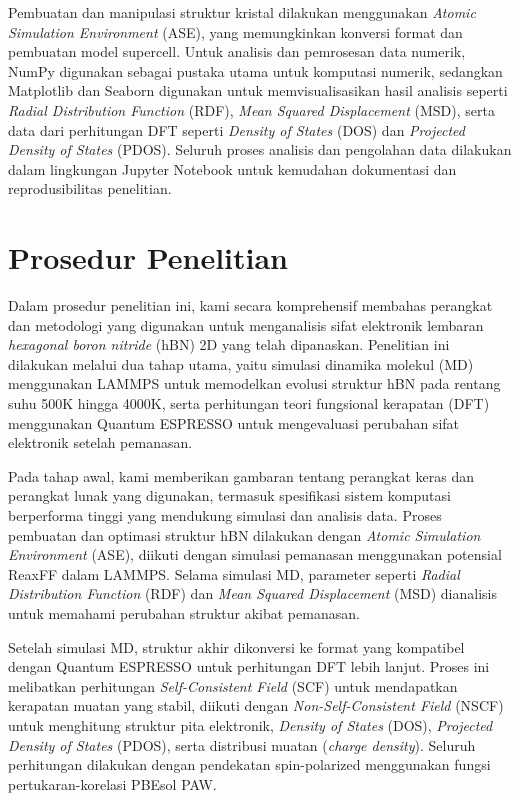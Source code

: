 Pembuatan dan manipulasi struktur kristal dilakukan menggunakan \textit{Atomic Simulation Environment} (ASE), yang memungkinkan konversi format dan pembuatan model supercell. Untuk analisis dan pemrosesan data numerik, NumPy digunakan sebagai pustaka utama untuk komputasi numerik, sedangkan Matplotlib dan Seaborn digunakan untuk memvisualisasikan hasil analisis seperti \textit{Radial Distribution Function} (RDF), \textit{Mean Squared Displacement} (MSD), serta data dari perhitungan DFT seperti \textit{Density of States} (DOS) dan \textit{Projected Density of States} (PDOS). Seluruh proses analisis dan pengolahan data dilakukan dalam lingkungan Jupyter Notebook untuk kemudahan dokumentasi dan reprodusibilitas penelitian.

\section{Prosedur Penelitian}
Dalam prosedur penelitian ini, kami secara komprehensif membahas perangkat dan metodologi yang digunakan untuk menganalisis sifat elektronik lembaran \textit{hexagonal boron nitride} (hBN) 2D yang telah dipanaskan. Penelitian ini dilakukan melalui dua tahap utama, yaitu simulasi dinamika molekul (MD) menggunakan LAMMPS untuk memodelkan evolusi struktur hBN pada rentang suhu 500K hingga 4000K, serta perhitungan teori fungsional kerapatan (DFT) menggunakan Quantum ESPRESSO untuk mengevaluasi perubahan sifat elektronik setelah pemanasan.

Pada tahap awal, kami memberikan gambaran tentang perangkat keras dan perangkat lunak yang digunakan, termasuk spesifikasi sistem komputasi berperforma tinggi yang mendukung simulasi dan analisis data. Proses pembuatan dan optimasi struktur hBN dilakukan dengan \textit{Atomic Simulation Environment} (ASE), diikuti dengan simulasi pemanasan menggunakan potensial ReaxFF dalam LAMMPS. Selama simulasi MD, parameter seperti \textit{Radial Distribution Function} (RDF) dan \textit{Mean Squared Displacement} (MSD) dianalisis untuk memahami perubahan struktur akibat pemanasan.

Setelah simulasi MD, struktur akhir dikonversi ke format yang kompatibel dengan Quantum ESPRESSO untuk perhitungan DFT lebih lanjut. Proses ini melibatkan perhitungan \textit{Self-Consistent Field} (SCF) untuk mendapatkan kerapatan muatan yang stabil, diikuti dengan \textit{Non-Self-Consistent Field} (NSCF) untuk menghitung struktur pita elektronik, \textit{Density of States} (DOS), \textit{Projected Density of States} (PDOS), serta distribusi muatan (\textit{charge density}). Seluruh perhitungan dilakukan dengan pendekatan spin-polarized menggunakan fungsi pertukaran-korelasi PBEsol PAW.

